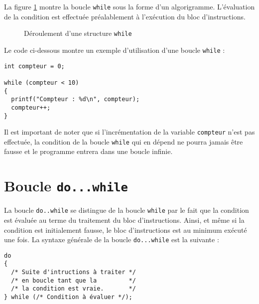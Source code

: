 \documentclass[DIV=calc,paper=a4,fontsize=11pt,twocolumn,halfparskip,parindent]{scrartcl} %
\begin{document}
La figure \ref{while} montre la boucle \texttt{while} sous la forme d'un algorigramme. L'évaluation de la condition est effectuée préalablement à l'exécution du bloc
d'instructions.
\begin{figure}[!h]
\centering
{}
\caption{Déroulement d'une structure \texttt{while}}\label{while}
\end{figure}

Le code ci-dessous montre un exemple d'utilisation d'une boucle \texttt{while} :
\begin{lstlisting}[frame=single]
int compteur = 0;
  
while (compteur < 10)
{
  printf("Compteur : %d\n", compteur);
  compteur++;
}
\end{lstlisting}

Il est important de noter que si l'incrémentation de la variable \texttt{compteur} n'est pas effectuée, la condition de la boucle \texttt{while} qui en dépend ne pourra
jamais être fausse et le programme entrera dans une boucle infinie. 

\section*{Boucle \texttt{do...while}}
La boucle \texttt{do..while} se distingue de la boucle \texttt{while} par le fait que la condition est évaluée au terme du traitement du bloc d'instructions. Ainsi, et
même si la condition est initialement fausse, le bloc d'instructions est au minimum exécuté une fois. La syntaxe générale de la boucle \texttt{do...while} est la suivante :
\begin{lstlisting}[frame=single]
do
{
  /* Suite d'intructions à traiter */
  /* en boucle tant que la         */
  /* la condition est vraie.       */
} while (/* Condition à évaluer */);
\end{lstlisting}
\end{document}
